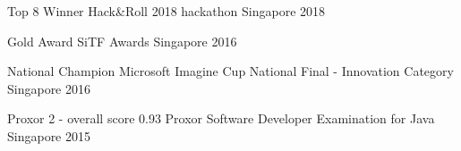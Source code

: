 



\begin{cvawards}

  \cvaward
    {Top 8 Winner} %
    {Hack\&Roll 2018 hackathon} %
    {Singapore} %
    {2018} %

  \cvaward
    {Gold Award} %
    {SiTF Awards} %
    {Singapore} %
    {2016} %

  \cvaward
    {National Champion} %
    {Microsoft Imagine Cup National Final - Innovation Category} %
    {Singapore} %
    {2016} %

  \cvaward
    {Proxor 2 - overall score 0.93} %
    {Proxor Software Developer Examination for Java} %
    {Singapore} %
    {2015} %

\end{cvawards}
